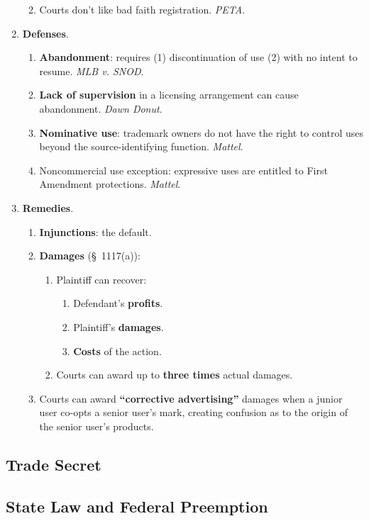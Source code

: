 \begin{enumerate}
\begin{enumerate}
\begin{enumerate}
            \end{enumerate}
        \item Courts don't like bad faith registration. \emph{PETA}.
    \end{enumerate}
    \item \textbf{Defenses}.
    \begin{enumerate}
        \item \textbf{Abandonment}: requires (1) discontinuation of use (2) 
        with no intent to resume. \emph{MLB v. SNOD}.
        \item \textbf{Lack of supervision} in a licensing arrangement can 
        cause abandonment. \emph{Dawn Donut}.
        \item \textbf{Nominative use}: trademark owners do not have the right 
        to control uses beyond the source-identifying function. \emph{Mattel}.
        \item Noncommercial use exception: expressive uses are entitled to 
        First Amendment protections. \emph{Mattel}.
    \end{enumerate}
    \item \textbf{Remedies}.
    \begin{enumerate}
        \item \textbf{Injunctions}: the default.
        \item \textbf{Damages} (\S\ 1117(a)):
        \begin{enumerate}
            \item Plaintiff can recover:
            \begin{enumerate}
                \item Defendant's \textbf{profits}.
                \item Plaintiff's \textbf{damages}.
                \item \textbf{Costs} of the action.
            \end{enumerate}
            \item Courts can award up to \textbf{three times} actual damages.
        \end{enumerate}
        \item Courts can award \textbf{``corrective advertising''} damages 
        when a junior user co-opts a senior user's mark, creating confusion as 
        to the origin of the senior user's products.
    \end{enumerate}
\end{enumerate}

\newpage

\subsection{Trade Secret}


\newpage

\subsection{State Law and Federal Preemption}

